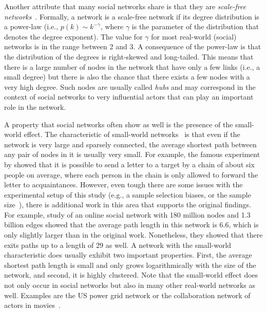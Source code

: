 Another attribute that many social networks share is that they are \emph{scale-free networks}~\cite{Barabasi2016}.
Formally, a network is a scale-free network if its degree distribution is a power-law (i.e., \( p(k) \sim k^{-\gamma} \), where \( \gamma \) is the parameter of the distribution that denotes the degree exponent).
The value for \( \gamma \) for most real-world (social) networks is in the range between 2 and 3.
A consequence of the power-law is that the distribution of the degrees is right-skewed and long-tailed.
This means that there is a large number of nodes in the network that have only a few links (i.e., a small degree) but there is also the chance that there exists a few nodes with a very high degree.
Such nodes are usually called \emph{hubs} and may correspond in the context of social networks to very influential actors that can play an important role in the network.

A property that social networks often show as well is the presence of the small-world effect.
The characteristic of small-world networks~\cite{Watts1999} is that even if the network is very large and sparsely connected, the average shortest path between any pair of nodes in it is usually very small.
For example, the famous experiment by \citet{Milgram1969} showed that it is possible to send a letter to a target by a chain of about six people on average, where each person in the chain is only allowed to forward the letter to acquaintances.
However, even tough there are some issues with the experimental setup of this study (e.g., a sample selection biases, or the sample size~\cite{Schnettler2009}), there is additional work in this area that supports the original findings.
For example, \citet{Leskovec2008} study of an online social network with 180 million nodes and 1.3 billion edges showed that the average path length in this network is 6.6, which is only slightly larger than in the original work.
Nonetheless, they showed that there exits paths up to a length of 29 as well.
A network with the small-world characteristic does usually exhibit two important properties.
First, the average shortest path length is small and only grows logarithmically with the size of the network, and second, it is highly clustered.
Note that the small-world effect does not only occur in social networks but also in many other real-world networks as well.
Examples are the US power grid network or the collaboration network of actors in movies~\cite{Watts1998}.




